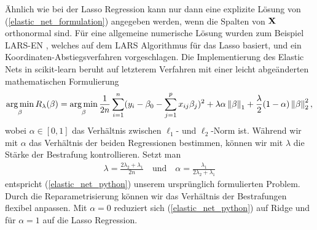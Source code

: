 Ähnlich wie bei der Lasso Regression kann nur dann eine explizite Lösung von (\ref{elastic_net_formulation}) angegeben werden, wenn die Spalten von $\mathbf{X}$ orthonormal sind. Für eine allgemeine numerische Lösung wurden zum Beispiel LARS-EN \cite{zou_elasticnet}, welches auf dem LARS Algorithmus für das Lasso basiert, und ein Koordinaten-Abstiegsverfahren \cite{friedman} vorgeschlagen. Die Implementierung des Elastic Nets in scikit-learn \cite{scikit_learn} beruht auf letzterem Verfahren mit einer leicht abgeänderten mathematischen Formulierung
\begin{align}
\label{elastic_net_python}
\operatorname*{arg\,min}_{\beta} R_{\lambda}(\beta) = \operatorname*{arg\,min}_{\beta} \frac{1}{2n}  \sum_{i=1}^{n}(y_i - \beta_0 - \sum_{j=1}^p x_{ij}\beta_j)^2 + \lambda \alpha \left\lVert \beta \right\rVert_{1} + \frac{\lambda}{2}(1-\alpha) \left\lVert \beta \right\rVert_{2}^2,
\end{align}
wobei $\alpha \in [0,1]$ das Verhältnis zwischen $\ell_1$- und $\ell_2$-Norm ist. Während wir mit $\alpha$ das Verhältnis der beiden Regressionen bestimmen, können wir mit $\lambda$ die Stärke der Bestrafung kontrollieren. Setzt man 
\begin{align}
\lambda = \frac{2\lambda_2 + \lambda_1}{2n} \quad \text{und} \quad \alpha = \frac{\lambda_1}{2\lambda_2 + \lambda_1}
\end{align}
entspricht (\ref{elastic_net_python}) unserem ursprünglich formulierten Problem. Durch die Reparametrisierung können wir das Verhältnis der Bestrafungen flexibel anpassen. Mit $\alpha = 0$ reduziert sich (\ref{elastic_net_python}) auf Ridge und für $\alpha = 1$ auf die Lasso Regression.


